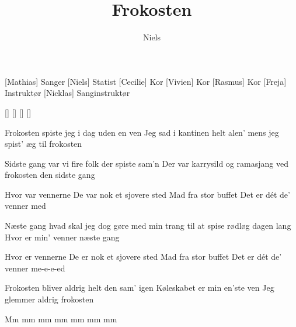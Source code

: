 \documentclass[a4paper,11pt]{article}
\title{Frokosten}
\author{Niels}
\begin{document}
\maketitle

\begin{roles}
[Mathias] Sanger
[Niels] Statist
[Cecilie] Kor
[Vivien] Kor
[Rasmus] Kor
[Freja] Instruktør
[Nicklas] Sanginstruktør
\end{roles}

\begin{props}
[]
[]
[]
[]
\end{props}


\begin{song}

%
Frokosten
spiste jeg i dag uden en ven
Jeg sad i kantinen helt alen'
mens jeg spist' æg
til frokosten

%
Sidste gang
var vi fire folk der spiste sam'n
Der var karrysild og ramasjang
ved frokosten
den sidste gang

%
Hvor var vennerne
De var nok
et sjovere sted
Mad fra stor buffet
Det er dét
de' venner med

%
Næste gang
hvad skal jeg dog gøre med min trang
til at spise rødløg dagen lang
Hvor er min' venner næste gang

%
Hvor er vennerne
De er nok
et sjovere sted
Mad fra stor buffet
Det er dét
de' venner me-e-e-ed

%
Frokosten
bliver aldrig helt den sam' igen
Køleskabet er min en'ste ven
Jeg glemmer aldrig frokosten

%
Mm mm mm mm mm mm mm

\end{song}
\end{document}
